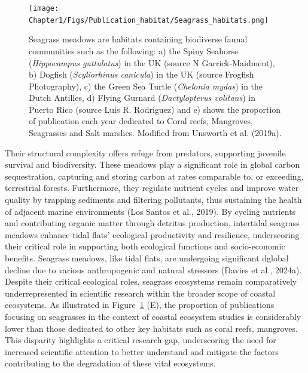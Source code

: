 \documentclass[
  letterpaper,
  11pt,
  english,
  singlespacing,
  headsepline]{MastersDoctoralThesis}
\begin{document}
\begin{spacing}{1.5}
\begin{figure}
{\texttt{[image: Chapter1/Figs/Publication\_habitat/Seagrass\_habitats.png]}

}

\caption{\label{fig-SeagrassHabitat}Seagrass meadows are habitats
containing biodiverse faunal communities such as the following: a) the
Spiny Seahorse (\emph{Hippocampus guttulatus}) in the UK (source N
Garrick-Maidment), b) Dogfish (\emph{Scyliorhinus canicula}) in the UK
(source Frogfish Photography), c) the Green Sea Turtle (\emph{Chelonia
mydas}) in the Dutch Antilles, d) Flying Gurnard (\emph{Dactylopterus
volitans}) in Puerto Rico (source Luis R. Rodriguez) and e) shows the
proportion of publication each year dedicated to Coral reefs, Mangroves,
Seagrasses and Salt marshes. Modified from Unsworth et al. (2019a).}

\end{figure}%

Their structural complexity offers refuge from predators, supporting
juvenile survival and biodiversity. These meadows play a significant
role in global carbon sequestration, capturing and storing carbon at
rates comparable to, or exceeding, terrestrial forests. Furthermore,
they regulate nutrient cycles and improve water quality by trapping
sediments and filtering pollutants, thus sustaining the health of
adjacent marine environments (Los Santos et al., 2019). By cycling
nutrients and contributing organic matter through detritus production,
intertidal seagrass meadows enhance tidal flats' ecological productivity
and resilience, underscoring their critical role in supporting both
ecological functions and socio-economic benefits. Seagrass meadows, like
tidal flats, are undergoing significant dglobal decline due to various
anthropogenic and natural stressors (Davies et al., 2024a). Despite
their critical ecological roles, seagrass ecosystems remain
comparatively underrepresented in scientific research within the broader
scope of coastal ecosystems. As illustrated in
Figure~\ref{fig-SeagrassHabitat} (E), the proportion of publications
focusing on seagrasses in the context of coastal ecosystem studies is
considerably lower than those dedicated to other key habitats such as
coral reefs, mangroves. This disparity highlights a critical research
gap, underscoring the need for increased scientific attention to better
understand and mitigate the factors contributing to the degradation of
these vital ecosystems.

\newpage


\end{spacing}
\end{document}
